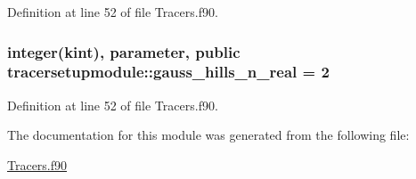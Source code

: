 Definition at line 52 of file Tracers.\+f90.

\hypertarget{classtracersetupmodule_a9a7a9e9cb8888b7269ea9b8336cd9360}{
\subsubsection[{gauss\+\_\+hills\+\_\+n\+\_\+real}]{\setlength{\rightskip}{0pt plus 5cm}integer(kint), parameter, public tracersetupmodule\+::gauss\+\_\+hills\+\_\+n\+\_\+real = 2}}\label{classtracersetupmodule_a9a7a9e9cb8888b7269ea9b8336cd9360}


Definition at line 52 of file Tracers.\+f90.



The documentation for this module was generated from the following file\+:\begin{DoxyCompactItemize}
\item 
\hyperlink{Tracers_8f90}{Tracers.\+f90}\end{DoxyCompactItemize}
